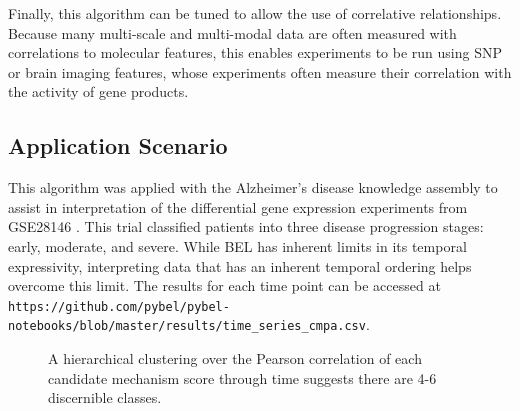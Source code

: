 Finally, this algorithm can be tuned to allow the use of correlative relationships. Because many multi-scale and multi-modal data are often measured with correlations to molecular features, this enables experiments to be run using SNP or brain imaging features, whose experiments often measure their correlation with the activity of gene products. 

\subsection{Application Scenario}

This algorithm was applied with the Alzheimer's disease knowledge assembly to assist in interpretation of the differential gene expression experiments from GSE28146 \cite{Blalock2011}. This trial classified patients into three disease progression stages: early, moderate, and severe. While BEL has inherent limits in its temporal expressivity, interpreting data that has an inherent temporal ordering helps overcome this limit. The results for each time point can be accessed at \verb|https://github.com/pybel/pybel-notebooks/blob/master/results/time_series_cmpa.csv|.

\begin{figure}
\captionsetup{format=plain}
\caption[Clustering of Time-series Candidate Mechanism Perturbation Amplitude Scores]{A hierarchical clustering over the Pearson correlation of each candidate mechanism score through time suggests there are 4-6 discernible classes.}
\label{Fig:time_series_clustering}
\end{figure}

